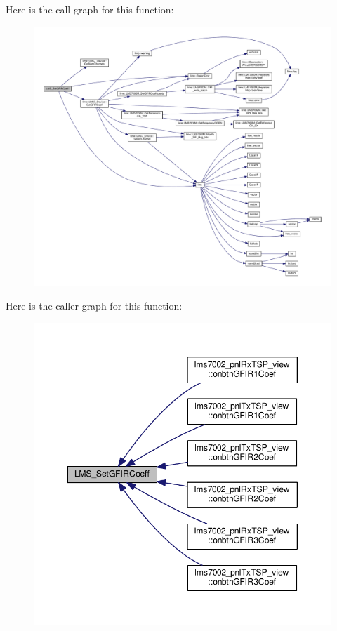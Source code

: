 Here is the call graph for this function\+:
\nopagebreak
\begin{figure}[H]
\begin{center}
\leavevmode
\includegraphics[width=350pt]{df/de1/lms7__api_8cpp_ad9538f07489ca171e270728fa1f6cc32_cgraph}
\end{center}
\end{figure}




Here is the caller graph for this function\+:
\nopagebreak
\begin{figure}[H]
\begin{center}
\leavevmode
\includegraphics[width=350pt]{df/de1/lms7__api_8cpp_ad9538f07489ca171e270728fa1f6cc32_icgraph}
\end{center}
\end{figure}


